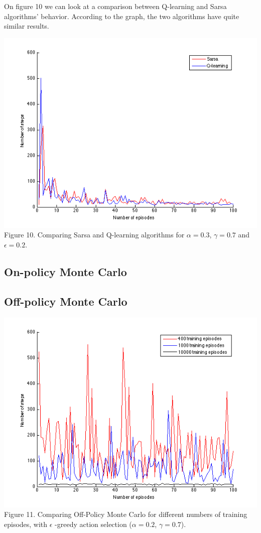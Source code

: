 \documentclass[a4paper,11pt]{article}
\begin{document}
On figure 10 we can look at a comparison between Q-learning and Sarsa algorithms' behavior. According to the graph, the two algorithms have quite similar results.

\begin{center}
\includegraphics[width=1.0\textwidth,height=0.4\textheight]{sarsaQ.png}
\label{Figure 1}
Figure 10. Comparing Sarsa and Q-learning algorithms for $\alpha = 0.3$, $\gamma = 0.7$ and $\epsilon = 0.2$.
\end{center}

\subsection*{On-policy Monte Carlo}


\subsection*{Off-policy Monte Carlo}
\begin{center}
\includegraphics[width=1.0\textwidth,height=0.4\textheight]{offpolicyMC.png}
\label{Figure 1}
Figure 11. Comparing Off-Policy Monte Carlo for different numbers of training episodes, with $\epsilon$ -greedy action selection ($\alpha = 0.2$, $\gamma = 0.7$).
\end{center}
\end{document}
